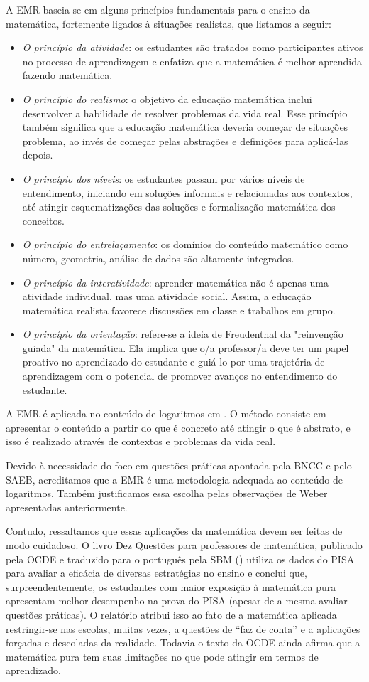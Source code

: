 \begin{apresentacao}
A EMR baseia-se em alguns princípios fundamentais para o ensino da matemática, fortemente ligados à situações realistas, que listamos a seguir:
\begin{itemize}
\item \textit{O princípio da atividade}: os estudantes são tratados como participantes ativos no processo de aprendizagem e enfatiza que a matemática é melhor aprendida fazendo matemática.
\item \textit{O princípio do realismo}: o objetivo da educação matemática inclui desenvolver a habilidade de resolver problemas da vida real. Esse princípio também significa que a educação matemática deveria começar de situações problema, ao invés de começar pelas abstrações e definições para aplicá-las depois.
\item \textit{O princípio dos níveis}: os estudantes passam por vários níveis de entendimento, iniciando em soluções informais e relacionadas aos contextos, até atingir esquematizações das soluções e formalização matemática dos conceitos. 
\item \textit{O princípio do entrelaçamento}: os domínios do conteúdo matemático como número, geometria, análise de dados são altamente integrados.
\item \textit{O princípio da interatividade}: aprender matemática não é apenas uma atividade individual, mas uma atividade social. Assim, a educação matemática realista favorece discussões em classe e trabalhos em grupo.
\item \textit{O princípio da orientação}: refere-se a ideia de Freudenthal da "reinvenção guiada" da matemática. Ela implica que o/a professor/a deve ter um papel proativo no aprendizado do estudante e guiá-lo por uma trajetória de aprendizagem com o potencial de promover avanços no entendimento do estudante.
\end{itemize}


A EMR é aplicada no conteúdo de logaritmos em \cite{Webb2011}. O método consiste em apresentar o conteúdo a partir do que é concreto até atingir o que é abstrato, e isso é realizado através de contextos e problemas da vida real.

Devido à necessidade do foco em questões práticas apontada pela BNCC e pelo SAEB, acreditamos que a EMR é uma metodologia adequada ao conteúdo de logaritmos. Também justificamos essa escolha pelas observações de Weber apresentadas anteriormente.

Contudo, ressaltamos que essas aplicações da matemática devem ser feitas de modo cuidadoso. O livro Dez Questões para professores de matemática, publicado pela OCDE e traduzido para o português pela SBM (\cite{OCDE2018}) utiliza os dados do PISA para avaliar a eficácia de diversas estratégias no ensino e conclui que, surpreendentemente, os estudantes com maior exposição à matemática pura apresentam melhor desempenho na prova do PISA (apesar de a mesma avaliar questões práticas). O relatório atribui isso ao fato de a matemática aplicada restringir-se nas escolas, muitas vezes, a questões de “faz de conta” e a aplicações forçadas e descoladas da realidade. Todavia o texto da OCDE ainda afirma que a matemática pura tem suas limitações no que pode atingir em termos de aprendizado.


\end{apresentacao}
